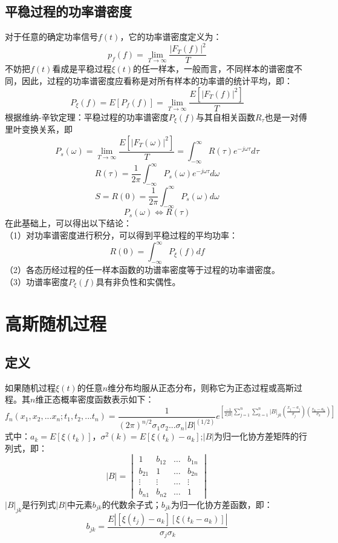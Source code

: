 \documentclass[12pt,a4paper,oneside]{ctexart}
\begin{document}
\subsection{平稳过程的功率谱密度}
对于任意的确定功率信号$f(t)$，它的功率谱密度定义为：
$$
   p_{f}(f) = \lim_{T \to \infty} \frac{|F_{T}(f)|^{2}}{T}
$$
\indent 不妨把$f(t)$看成是平稳过程$\xi(t)$的任一样本，一般而言，不同样本的谱密度不同，因此，过程的功率谱密度应看称是对所有样本的功率谱的统计平均，即：
$$
   P_{\xi}(f) = E[P_{f}(f)] = \lim_{T \to \infty}\frac{E[|F_{T}(f)|^{2}]}{T}
$$
\indent 根据维纳-辛钦定理：平稳过程的功率谱密度$P_{\xi}(f)$与其自相关函数$R_{\tau}$也是一对傅里叶变换关系，即
$$
   P_{s}(\omega) = \lim_{T \to \infty}\frac{E[|F_{T}(\omega)|^{2}]}{T} = \int_{-\infty}^{\infty}R(\tau)e^{-j\omega\tau}d\tau
$$
$$
   R(\tau) = \frac{1}{2\pi}\int_{-\infty}^{\infty}P_{s}(\omega)e^{-j\omega\tau}d\omega
$$
$$
   S = R(0) = \frac{1}{2\pi}\int_{-\infty}^{\infty}P_{s}(\omega)d\omega
$$
$$
   P_{s}(\omega)\Leftrightarrow R(\tau)
$$
在此基础上，可以得出以下结论：\\
（1）对功率谱密度进行积分，可以得到平稳过程的平均功率：
$$
   R(0) = \int_{-\infty}^{\infty}P_{\xi}(f)df
$$
（2）各态历经过程的任一样本函数的功谱率密度等于过程的功率谱密度。\\
（3）功谱率密度$P_{\xi}(f)$具有非负性和实偶性。
\section{高斯随机过程}
\subsection{定义}
如果随机过程$\xi(t)$的任意$n$维分布均服从正态分布，则称它为正态过程或高斯过程。其$n$维正态概率密度函数表示如下：
$$
   f_{n}(x_{1},x_{2},...x_{n};t_{1},t_{2},...t_{n}) = \frac{1}{(2\pi)^{n/2}\sigma_{1}\sigma_{2}...\sigma_{n}|B|^(1/2)}e^{\left[\frac{-1}{2|B|}  {\textstyle \sum_{j=1}^{n}}  {\textstyle \sum_{k=1}^{n}}|B|_{jk}(\frac{x_{j} - a_{j}}{\sigma _{j}})(\frac{x_{k}-a_{k}}{\sigma_{k} } )\right]}
$$
式中：$a_{k} = E\left[\xi(t_{k})\right]$，$\sigma^{2}(k) = E\left[\xi(t_{k}) - a_{k}\right]$;$|B|$为归一化协方差矩阵的行列式，即：
$$
   |B| = \begin{vmatrix}
    1 & b_{12}& \dots   &b_{1n} \\
    b_{21} &1 & \dots  & b_{2n} \\
     \vdots &\vdots  &\dots  &\vdots \\
     b_{n1}&b_{n2}  &\dots  &1
   \end{vmatrix}  
$$
$|B|_{jk}$是行列式$|B|$中元素$b_{jk}$的代数余子式；$b_{jk}$为归一化协方差函数，即：
$$
   b_{jk} = \frac{E|\left[\xi(t_{j}) - a_{k}\right]\left[\xi(t_{k} - a_{k})\right]|}{\sigma_{j}\sigma_{k}}
$$
\end{document}
